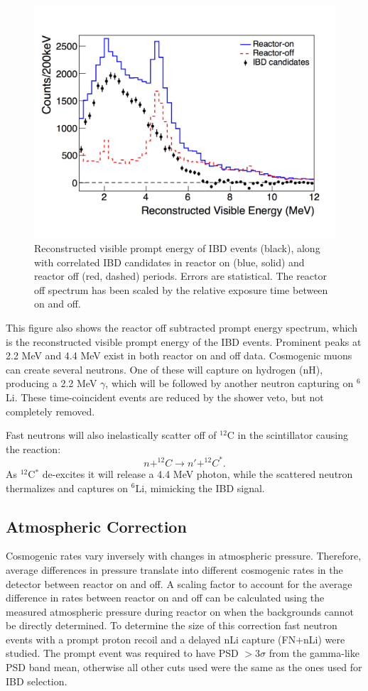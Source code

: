 \begin{figure}[!b]
	\centering
	\includegraphics[width=0.8\linewidth]{tex/7-oscillation-images/Spectrum}
	\caption{Reconstructed visible prompt energy of IBD events (black), along with correlated IBD candidates in reactor on (blue, solid) and reactor off (red, dashed) periods. Errors are statistical. The reactor off spectrum has been scaled by the relative exposure time between on and off. \cite{Ashenfelter:2018jrx}}
	\label{fig:spectrumresults}
\end{figure}

This figure also shows the reactor off subtracted prompt energy spectrum, which is the reconstructed visible prompt energy of the IBD events.
Prominent peaks at 2.2 MeV and 4.4 MeV exist in both reactor on and off data.
Cosmogenic muons can create several neutrons. One of these will capture on hydrogen (nH), producing a 2.2 MeV $\gamma$, which will be followed by another neutron capturing on $^6$Li. 
These time-coincident events are reduced by the shower veto, but not completely removed.

Fast neutrons will also inelastically scatter off of $^{12}$C in the scintillator causing the reaction:
\begin{equation}
	n + ^{12}C \rightarrow n' + ^{12}C^*.
\end{equation}
As $^{12}$C$^*$ de-excites it will release a 4.4 MeV photon, while the scattered neutron thermalizes and captures on $^{6}$Li, mimicking the IBD signal.


\subsection{Atmospheric Correction}

Cosmogenic rates vary inversely with changes in atmospheric pressure. 
Therefore, average differences in pressure translate into different cosmogenic rates in the detector between reactor on and off. 
A scaling factor to account for the average difference in rates between reactor on and off can be calculated using the measured atmospheric pressure during reactor on when the backgrounds cannot be directly determined.
To determine the size of this correction fast neutron events with a prompt proton recoil and a delayed nLi capture (FN+nLi) were studied. 
The prompt event was required to have PSD $>3\sigma$ from the gamma-like PSD band mean, otherwise all other cuts used were the same as the ones used for IBD selection.

